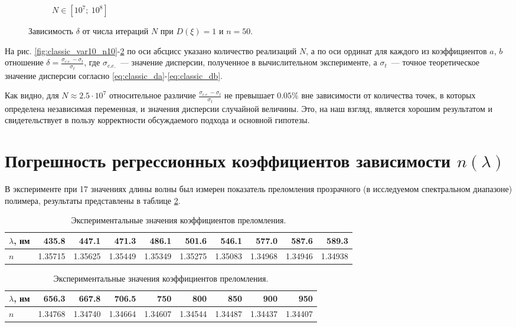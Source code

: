 \documentclass[11pt,a4paper]{article}
\theoremstyle{definition}
\begin{document}
\begin{figure}[h!]
\begin{subfigure}[b]{0.3\textwidth}
    \caption{$N \in [10^7;~10^8]$}
    \label{fig:classic_var1_n50_end}
  \end{subfigure}
  \caption{Зависимость $\delta$ от числа итераций $N$ при $D(\xi) = 1$ и $n = 50$.}
  \label{fig:classic_var1_n50}
\end{figure}

На рис. \ref{fig:classic_var10_n10}-\ref{fig:classic_var1_n50}
по оси абсцисс указано количество реализаций $N$, а по
оси ординат для каждого из коэффициентов $a$, $b$ отношение
$\delta = \frac{\sigma_{c.e.} - \sigma_t}{\sigma_t}$, где $\sigma_{c.e.}$~---
значение дисперсии, полученное в вычислительном эксперименте, а
$\sigma_{t}$~--- точное теоретическое значение дисперсии согласно 
\eqref{eq:classic_da}-\eqref{eq:classic_db}.

Как видно, для $N \approx 2.5 \cdot 10^7$ относительное различие
$\frac{\sigma_{c.e.} - \sigma_t}{\sigma_t}$ не
превышает $0.05 \%$ вне зависимости от количества точек, в которых
определена независимая переменная, и значения дисперсии случайной величины.
Это, на наш взгляд, является хорошим результатом и
свидетельствует в пользу корректности обсуждаемого подхода и основной
гипотезы.

\section{Погрешность регрессионных коэффициентов зависимости $n(\lambda)$}

В эксперименте при 17 значениях длины волны был измерен
показатель преломления прозрачного (в исследуемом спектральном
диапазоне) полимера, результаты представлены в таблице \ref{tabl:source_data}.

\begin{table}[h]
  \footnotesize
  \begin{tabular}{| l | r | r | r | r | r | r | r | r | r |} \hline
	$\lambda$, нм	& 435.8		& 447.1		& 471.3		& 486.1		& 501.6		& 546.1		& 577.0		& 587.6		& 589.3		\\ \hline
	$n$				& 1.35715	& 1.35625	& 1.35449	& 1.35349	& 1.35275	& 1.35083	& 1.34968	& 1.34946	& 1.34938	\\ \hline
  \end{tabular}
  \begin{tabular}{| l | r | r | r | r | r | r | r | r |} \hline
	$\lambda$, нм	& 656.3		& 667.8		& 706.5		& 750		& 800		& 850		& 900		& 950			\\ \hline
	$n$				& 1.34768	& 1.34740	& 1.34664	& 1.34607	& 1.34544	& 1.34487	& 1.34437	& 1.34407		\\ \hline
  \end{tabular}
  \caption{Экспериментальные значения коэффициентов преломления.}
  \label{tabl:source_data}
\end{table}
\end{document}
